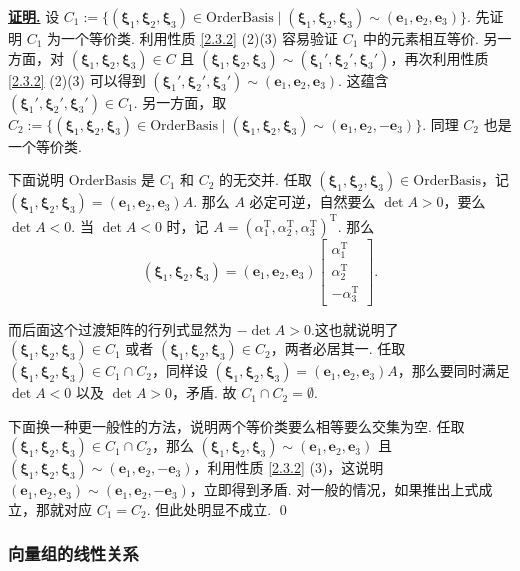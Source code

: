 \documentclass[10pt,openany]{article}
\theoremstyle{thmstyle} %
\theoremstyle{defstyle} %
\theoremstyle{prostyle} %
\theoremstyle{exastyle}
\theoremstyle{remstyle}
\renewenvironment{proof}[1][证明]{\par\underline{\textbf{#1.}} \;\fangsong}{\qed\par}
\newcommand{\T}{^{\text{T}}}
\newcommand{\bmxi}{\bm{\xi}}
\begin{document}
\begin{proof}
	设 \( C_1:=\{ (\bmxi_1,\bmxi_2,\bmxi_3) \in \text{OrderBasis} \mid (\bmxi_1,\bmxi_2,\bmxi_3) \sim (\bm{e}_1,\bm{e}_2,\bm{e}_3) \} \). 先证明 \( C_1 \) 为一个等价类. 利用性质 \ref{2.3.2} (2)(3) 容易验证 \( C_1 \) 中的元素相互等价. 另一方面，对 \( (\bmxi_1,\bmxi_2,\bmxi_3) \in C \) 且 \(  (\bmxi_1,\bmxi_2,\bmxi_3) \sim  (\bmxi_1',\bmxi_2',\bmxi_3') \)，再次利用性质 \ref{2.3.2} (2)(3) 可以得到 \( (\bmxi_1',\bmxi_2',\bmxi_3') \sim (\bm{e}_1,\bm{e}_2,\bm{e}_3) \). 这蕴含 \( (\bmxi_1',\bmxi_2',\bmxi_3') \in C_1 \). 另一方面，取 \( C_2:=\{ (\bmxi_1,\bmxi_2,\bmxi_3) \in \text{OrderBasis} \mid (\bmxi_1,\bmxi_2,\bmxi_3) \sim (\bm{e}_1,\bm{e}_2,-\bm{e}_3) \} \). 同理 \( C_2 \) 也是一个等价类.
	
	下面说明 \( \text{OrderBasis} \) 是 \( C_1 \) 和 \( C_2 \) 的无交并. 任取 \( (\bmxi_1,\bmxi_2,\bmxi_3) \in \text{OrderBasis} \)，记 \( (\bmxi_1,\bmxi_2,\bmxi_3)=(\bm{e}_1,\bm{e}_2,\bm{e}_3)A \). 那么 \( A \) 必定可逆，自然要么 \( \det A>0 \)，要么 \( \det A<0 \). 当 \( \det A<0 \) 时，记 \( A=(\alpha_1\T,\alpha_2\T,\alpha_3\T)\T \). 那么 
	\[ (\bmxi_1,\bmxi_2,\bmxi_3)=(\bm{e}_1,\bm{e}_2,\bm{e}_3)\begin{bmatrix}
     \alpha_1\T \\ \alpha_2\T \\ -\alpha_3\T
	\end{bmatrix}. \]
	
	而后面这个过渡矩阵的行列式显然为 \( -\det A>0 \).这也就说明了 \( (\bmxi_1,\bmxi_2,\bmxi_3) \in C_1 \) 或者 \( (\bmxi_1,\bmxi_2,\bmxi_3) \in C_2 \)，两者必居其一. 任取 \( (\bmxi_1,\bmxi_2,\bmxi_3) \in C_1 \cap C_2 \)，同样设 \( (\bmxi_1,\bmxi_2,\bmxi_3)=(\bm{e}_1,\bm{e}_2,\bm{e}_3)A \)，那么要同时满足 \( \det A<0 \) 以及 \( \det A>0 \)，矛盾. 故 \( C_1 \cap C_2= \emptyset \).
	
	下面换一种更一般性的方法，说明两个等价类要么相等要么交集为空. 任取 \( (\bmxi_1,\bmxi_2,\bmxi_3) \in C_1 \cap C_2 \)，那么 \( (\bmxi_1,\bmxi_2,\bmxi_3)  \sim (\bm{e}_1,\bm{e}_2,\bm{e}_3) \) 且 \( (\bmxi_1,\bmxi_2,\bmxi_3)  \sim (\bm{e}_1,\bm{e}_2,-\bm{e}_3) \)，利用性质 \ref{2.3.2} (3)，这说明 \( (\bm{e}_1,\bm{e}_2,\bm{e}_3) \sim (\bm{e}_1,\bm{e}_2,-\bm{e}_3) \)，立即得到矛盾. 对一般的情况，如果推出上式成立，那就对应 \( C_1=C_2 \). 但此处明显不成立.
\end{proof}

\subsubsection{向量组的线性关系}\label{Sec 2.3.2}
\end{document}
